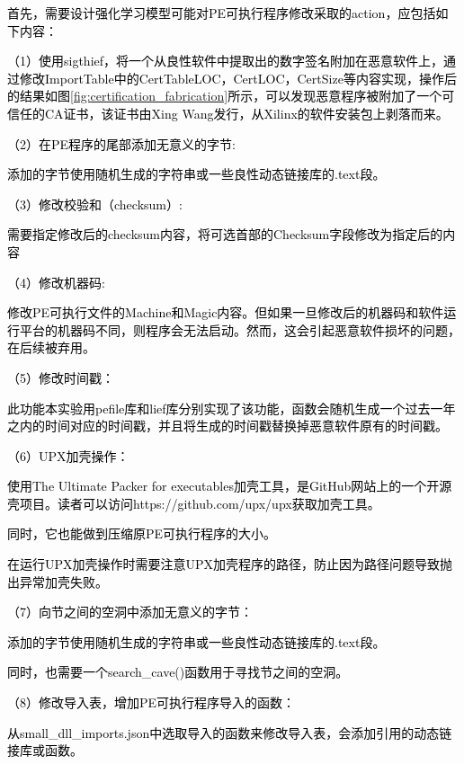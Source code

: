 \textcolor{black}{首先，需要设计强化学习模型可能对PE可执行程序修改采取的action，应包括如下内容：}

\textcolor{black}{（1）使用sigthief，将一个从良性软件中提取出的数字签名附加在恶意软件上，通过修改ImportTable中的CertTableLOC，CertLOC，CertSize等内容实现，操作后的结果如图\ref{fig:certification_fabrication}所示，可以发现恶意程序被附加了一个可信任的CA证书，该证书由Xing Wang发行，从Xilinx的软件安装包上剥落而来。}

\textcolor{black}{（2）在PE程序的尾部添加无意义的字节:}

\textcolor{black}{添加的字节使用随机生成的字符串或一些良性动态链接库的.text段。}

\textcolor{black}{（3）修改校验和（checksum）:}

\textcolor{black}{需要指定修改后的checksum内容，将可选首部的Checksum字段修改为指定后的内容}

\textcolor{black}{（4）修改机器码:}

\textcolor{black}{修改PE可执行文件的Machine和Magic内容。但如果一旦修改后的机器码和软件运行平台的机器码不同，则程序会无法启动。然而，这会引起恶意软件损坏的问题，在后续被弃用。}

\textcolor{black}{（5）修改时间戳：}

\textcolor{black}{此功能本实验用pefile库和lief库分别实现了该功能，函数会随机生成一个过去一年之内的时间对应的时间戳，并且将生成的时间戳替换掉恶意软件原有的时间戳。}

\textcolor{black}{（6）UPX加壳操作：}

\textcolor{black}{使用The Ultimate Packer for executables加壳工具，是GitHub网站上的一个开源壳项目。读者可以访问https://github.com/upx/upx获取加壳工具。}

\textcolor{black}{同时，它也能做到压缩原PE可执行程序的大小。}

\textcolor{black}{在运行UPX加壳操作时需要注意UPX加壳程序的路径，防止因为路径问题导致抛出异常加壳失败。}

\textcolor{black}{（7）向节之间的空洞中添加无意义的字节：}

\textcolor{black}{添加的字节使用随机生成的字符串或一些良性动态链接库的.text段。}

\textcolor{black}{同时，也需要一个search\_cave()函数用于寻找节之间的空洞。}

\textcolor{black}{（8）修改导入表，增加PE可执行程序导入的函数：}

\textcolor{black}{从small\_dll\_imports.json中选取导入的函数来修改导入表，会添加引用的动态链接库或函数。}

